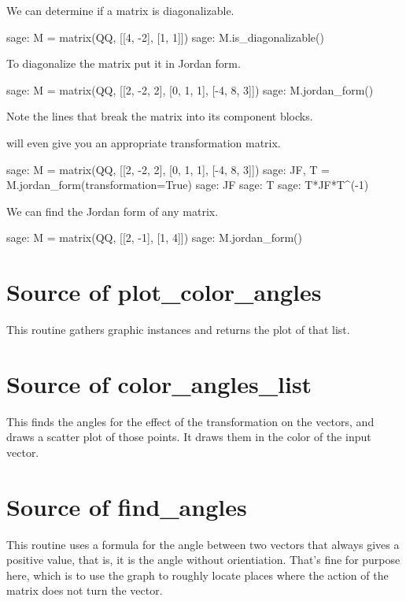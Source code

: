 We can determine if a matrix is diagonalizable.
\begin{sagecommandline}
sage: M =  matrix(QQ, [[4, -2], [1, 1]])  
sage: M.is_diagonalizable()
\end{sagecommandline}
\noindent
To diagonalize the matrix put it in Jordan form.
\begin{sagecommandline}
sage: M =  matrix(QQ, [[2, -2, 2], [0, 1, 1], [-4, 8, 3]])  
sage: M.jordan_form()
\end{sagecommandline}
\noindent 
Note the \inlinecode{-+-+-} lines that break the matrix into its component
blocks.

\Sage{} will even give you an appropriate transformation matrix.
\begin{sagecommandline}[d,0,1]
sage: M =  matrix(QQ, [[2, -2, 2], [0, 1, 1], [-4, 8, 3]])  
sage: JF, T = M.jordan_form(transformation=True)
sage: JF
sage: T
sage: T*JF*T^(-1)
\end{sagecommandline}

We can find the Jordan form of any matrix.
\begin{sagecommandline}
sage: M =  matrix(QQ, [[2, -1], [1, 4]])  
sage: M.jordan_form()
\end{sagecommandline}



\section{Source of plot\_color\_angles}
This routine gathers graphic instances and returns the plot of that list.


\section{Source of color\_angles\_list}
This finds the angles for the effect of the transformation on the vectors,
and draws a scatter plot of those points.
It draws them in the color of the input vector.


\section{Source of find\_angles}
This routine uses a formula for the angle between two vectors that 
always gives a positive value, that is, it is the angle without orientiation.
That's fine for purpose here, which is to use the graph to 
roughly locate places where the action of the matrix does not turn the
vector. 



